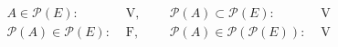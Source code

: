 \begin{align*}
  &A \in \mathcal{P}(E): &\text{ V}, & & &\mathcal{P}(A) \subset \mathcal{P}(E): &\text{ V}  \\
  &\mathcal{P}(A) \in \mathcal{P}(E): &\text{ F}, & & &\mathcal{P}(A) \in \mathcal{P}\left( \mathcal{P}(E)\right): &\text{ V} 
\end{align*}
